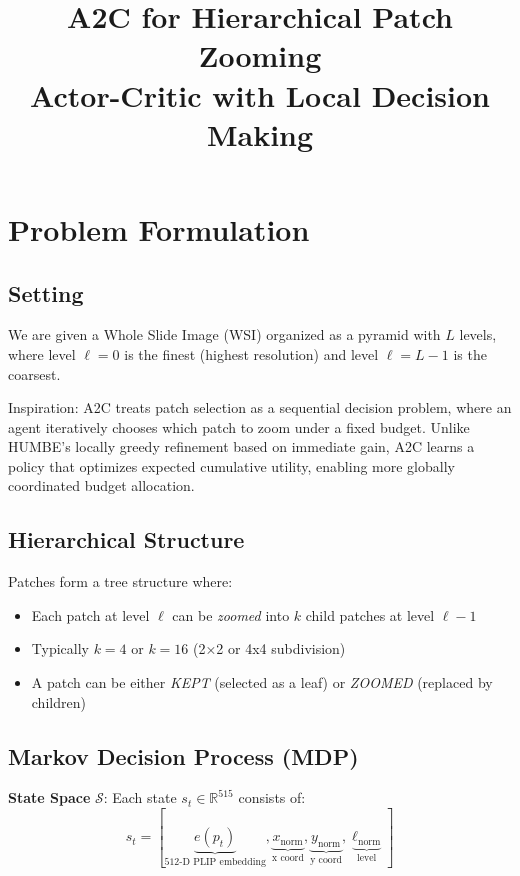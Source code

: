 \documentclass[11pt]{article}
\title{A2C for Hierarchical Patch Zooming\\
\large Actor-Critic with Local Decision Making}
\author{}
\date{}
\begin{document}
\maketitle

\section{Problem Formulation}

\subsection{Setting}
We are given a Whole Slide Image (WSI) organized as a pyramid with $L$ levels, where level $\ell = 0$ is the finest (highest resolution) and level $\ell = L-1$ is the coarsest.

Inspiration: A2C treats patch selection as a sequential decision problem, where an agent iteratively chooses which patch to zoom under a fixed budget. Unlike HUMBE’s locally greedy refinement based on immediate gain, A2C learns a policy that optimizes expected cumulative utility, enabling more globally coordinated budget allocation.

\subsection{Hierarchical Structure}
Patches form a tree structure where:
\begin{itemize}[nosep]
    \item Each patch at level $\ell$ can be \emph{zoomed} into $k$ child patches at level $\ell - 1$
    \item Typically $k = 4$ or $k = 16$ (2×2 or 4x4 subdivision)
    \item A patch can be either \emph{KEPT} (selected as a leaf) or \emph{ZOOMED} (replaced by children)
\end{itemize}

\subsection{Markov Decision Process (MDP)}

\textbf{State Space} $\mathcal{S}$: Each state $s_t \in \mathbb{R}^{515}$ consists of:
\begin{equation}
s_t = [\underbrace{e(p_t)}_{\text{512-D PLIP embedding}}, \underbrace{x_{\text{norm}}}_{\text{x coord}}, \underbrace{y_{\text{norm}}}_{\text{y coord}}, \underbrace{\ell_{\text{norm}}}_{\text{level}}]
\end{equation}
\end{document}
